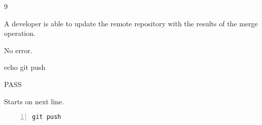 \begin{description}[align=right,leftmargin=3.2cm,labelindent=3.0cm]
\item[Step:] 9
\item[Confirm:] A developer is able to update the remote repository with the results of the merge operation.
\item[Expectation:] No error.
\item[Command:] echo git  push
\item[Test Result:] PASS
\item[Evidence:] Starts on next line.
\end{description}
\begin{lstlisting}[numbers=left]
git push

\end{lstlisting}
